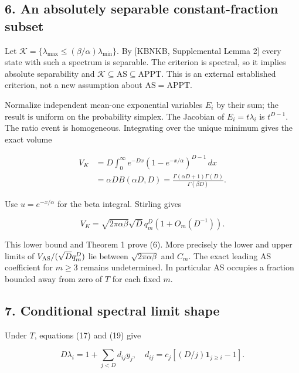 \documentclass[
  11pt,
]{article}
\begin{document}
\hypertarget{an-absolutely-separable-constant-fraction-subset}{%
\subsection{6. An absolutely separable constant-fraction
subset}\label{an-absolutely-separable-constant-fraction-subset}}

Let \(\mathcal K=\{\lambda_{\max}\leq(\beta/\alpha)\lambda_{\min}\}\).
By {[}KBNKB, Supplemental Lemma 2{]} every state with such a spectrum is
separable. The criterion is spectral, so it implies absolute
separability and
\(\mathcal K\subseteq\mathrm{AS}\subseteq\mathrm{APPT}\). This is an
external established criterion, not a new assumption about
\(\mathrm{AS}=\mathrm{APPT}\).

Normalize independent mean-one exponential variables \(E_i\) by their
sum; the result is uniform on the probability simplex. The Jacobian of
\(E_i=t\lambda_i\) is \(t^{D-1}\). The ratio event is homogeneous.
Integrating over the unique minimum gives the exact volume

\[
\begin{aligned}
V_K&=D\int_0^\infty e^{-Dx}(1-e^{-x/\alpha})^{D-1}\,dx\\
&=\alpha D B(\alpha D,D)
=\frac{\Gamma(\alpha D+1)\Gamma(D)}{\Gamma(\beta D)}.
\end{aligned}
\tag{31}
\]

Use \(u=e^{-x/\alpha}\) for the beta integral. Stirling gives

\[
V_K=\sqrt{2\pi\alpha\beta}\sqrt D q_m^D(1+O_m(D^{-1})).
\tag{32}
\]

This lower bound and Theorem 1 prove (6). More precisely the lower and
upper limits of \(V_{\rm AS}/(\sqrt Dq_m^D)\) lie between
\(\sqrt{2\pi\alpha\beta}\) and \(C_m\). The exact leading AS coefficient
for \(m\geq3\) remains undetermined. In particular AS occupies a
fraction bounded away from zero of \(T\) for each fixed \(m\).

\hypertarget{conditional-spectral-limit-shape}{%
\subsection{7. Conditional spectral limit
shape}\label{conditional-spectral-limit-shape}}

Under \(T\), equations (17) and (19) give

\[
D\lambda_i=1+\sum_{j<D}d_{ij}y_j,\quad
 d_{ij}=c_j[(D/j)\mathbf1_{j\geq i}-1].
\tag{33}
\]
\end{document}
